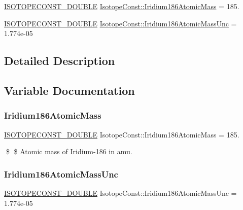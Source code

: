 \begin{DoxyCompactItemize}
\item 
\mbox{\hyperlink{group___isotope_const-_macros_ga8f45a7272ce02c0b4c65c44636ed719a}{I\+S\+O\+T\+O\+P\+E\+C\+O\+N\+S\+T\+\_\+\+D\+O\+U\+B\+LE}} \mbox{\hyperlink{group___isotope_const-_iridium-_ir186_ga198c5a90cd7e4edc7e9a4b69675de33f}{Isotope\+Const\+::\+Iridium186\+Atomic\+Mass}} = 185.
\item 
\mbox{\hyperlink{group___isotope_const-_macros_ga8f45a7272ce02c0b4c65c44636ed719a}{I\+S\+O\+T\+O\+P\+E\+C\+O\+N\+S\+T\+\_\+\+D\+O\+U\+B\+LE}} \mbox{\hyperlink{group___isotope_const-_iridium-_ir186_gad129c697e12825fedf0998a7a16c5915}{Isotope\+Const\+::\+Iridium186\+Atomic\+Mass\+Unc}} = 1.\+774e-\/05
\end{DoxyCompactItemize}


\subsection{Detailed Description}


\subsection{Variable Documentation}
\mbox{\label{group___isotope_const-_iridium-_ir186_ga198c5a90cd7e4edc7e9a4b69675de33f}} 
\subsubsection{\texorpdfstring{Iridium186\+Atomic\+Mass}{Iridium186AtomicMass}}
{\footnotesize\ttfamily \mbox{\hyperlink{group___isotope_const-_macros_ga8f45a7272ce02c0b4c65c44636ed719a}{I\+S\+O\+T\+O\+P\+E\+C\+O\+N\+S\+T\+\_\+\+D\+O\+U\+B\+LE}} Isotope\+Const\+::\+Iridium186\+Atomic\+Mass = 185.}

\$ \$ Atomic mass of Iridium-\/186 in amu. \mbox{\label{group___isotope_const-_iridium-_ir186_gad129c697e12825fedf0998a7a16c5915}} 
\subsubsection{\texorpdfstring{Iridium186\+Atomic\+Mass\+Unc}{Iridium186AtomicMassUnc}}
{\footnotesize\ttfamily \mbox{\hyperlink{group___isotope_const-_macros_ga8f45a7272ce02c0b4c65c44636ed719a}{I\+S\+O\+T\+O\+P\+E\+C\+O\+N\+S\+T\+\_\+\+D\+O\+U\+B\+LE}} Isotope\+Const\+::\+Iridium186\+Atomic\+Mass\+Unc = 1.\+774e-\/05}


